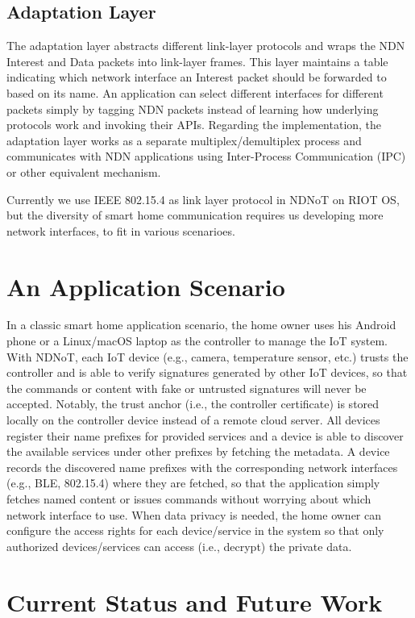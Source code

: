 \documentclass[sigconf]{acmart}
\begin{document}
\subsection{Adaptation Layer}

The adaptation layer abstracts different link-layer protocols and wraps the NDN Interest and Data packets into link-layer frames.
This layer maintains a table indicating which network interface an Interest packet should be forwarded to based on its name.
An application can select different interfaces for different packets simply by tagging NDN packets instead of learning how underlying protocols work and invoking their APIs.
Regarding the implementation, the adaptation layer works as a separate multiplex/demultiplex process and communicates with NDN applications using Inter-Process Communication (IPC) or other equivalent mechanism.

Currently we use IEEE 802.15.4 as link layer protocol in NDNoT on RIOT OS, but the diversity of smart home communication requires us developing more network interfaces, to fit in various scenarioes.

\section{An Application Scenario}

In a classic smart home application scenario, the home owner uses his Android phone or a Linux/macOS laptop as the controller to manage the IoT system.
With NDNoT, each IoT device (e.g., camera, temperature sensor, etc.) trusts the controller and is able to verify signatures generated by other IoT devices, so that the commands or content with fake or untrusted signatures will never be accepted.
Notably, the trust anchor (i.e., the controller certificate) is stored locally on the controller device instead of a remote cloud server.
All devices register their name prefixes for provided services and a device is able to discover the available services under other prefixes by fetching the metadata.
A device records the discovered name prefixes with the corresponding network interfaces (e.g., BLE, 802.15.4) where they are fetched, so that the application simply fetches named content or issues commands without worrying about which network interface to use.
When data privacy is needed, the home owner can configure the access rights for each device/service in the system so that only authorized devices/services can access (i.e., decrypt) the private data.


\section{Current Status and Future Work}
\end{document}
